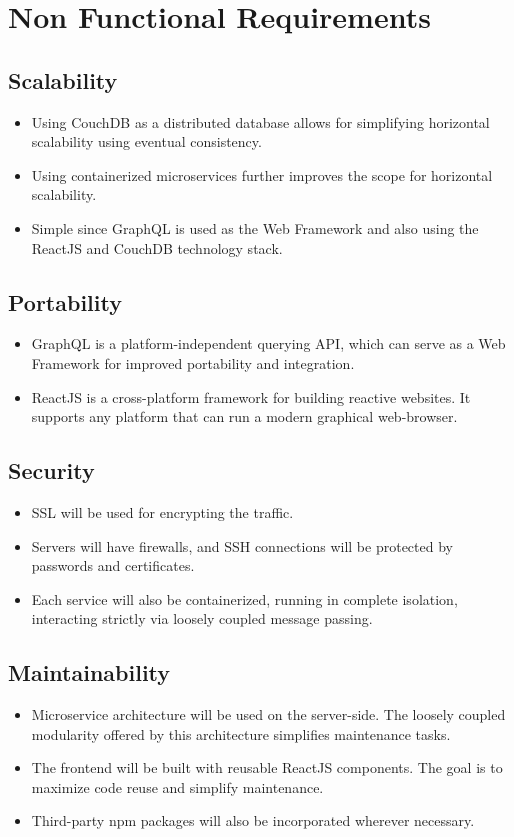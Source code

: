 \section{Non Functional Requirements}

\subsection{Scalability}
\begin{itemize}
    \item Using CouchDB as a distributed database allows for simplifying horizontal scalability using eventual consistency.
    \item Using containerized microservices further improves the scope for horizontal scalability.
    \item Simple since GraphQL is used as the Web Framework and also using the ReactJS and CouchDB technology stack.
\end{itemize}

\subsection{Portability}
\begin{itemize}
    \item GraphQL is a platform-independent querying API, 
    which can serve as a Web Framework for improved portability and integration.
    \item ReactJS is a cross-platform framework for building reactive websites. 
    It supports any platform that can run a modern graphical web-browser.
\end{itemize}

\subsection{Security}
\begin{itemize}
    \item SSL will be used for encrypting the traffic.
    \item Servers will have firewalls, and SSH connections will be protected by passwords and certificates.
    \item Each service will also be containerized, running in complete isolation, interacting strictly via loosely coupled message passing.
\end{itemize}

\subsection{Maintainability}
\begin{itemize}
    \item Microservice architecture will be used on the server-side. 
    The loosely coupled modularity offered by this architecture simplifies maintenance tasks.
    \item The frontend will be built with reusable ReactJS components. 
    The goal is to maximize code reuse and simplify maintenance.
    \item Third-party npm packages will also be incorporated wherever necessary.
\end{itemize}

